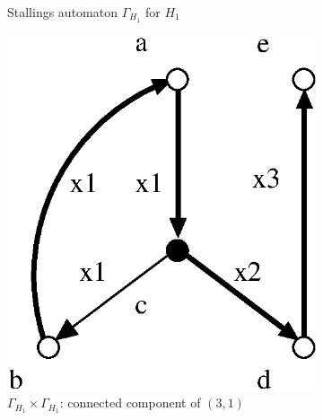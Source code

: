 \documentclass[a4paper,12pt]{article}
\newcommand{\G}{\Gamma }
\numberwithin{equation}{section}
\numberwithin{figure}{section}
\begin{document}
\begin{figure}
\begin{center}
\begin{subfigure}[b]{.25\columnwidth}
\caption{Stallings automaton $\G_{H_1}$ for $H_1$}
\label{fig:stall1}
\end{subfigure}
\hspace{5mm}
\begin{subfigure}[b]{.25\columnwidth}
\includegraphics[scale=.52]{GxG-1.eps}
\caption{$\G_{H_1}\times \G_{H_1}$: connected component of $(3,1)$}
\label{fig:GxG-1}
\end{subfigure}
\hspace{5mm}
\begin{subfigure}[b]{.25\columnwidth}

\end{subfigure}
\end{center}
\end{figure}
\end{document}
